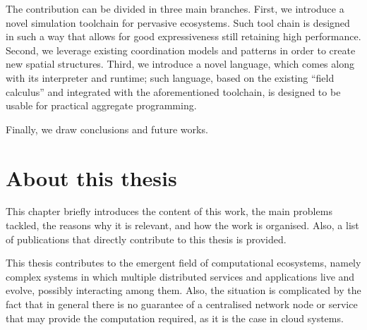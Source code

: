 \documentclass[12pt,a4paper,twoside,openright]{book}
\begin{document}
The contribution can be divided in three main branches.
%
First, we introduce a novel simulation toolchain for pervasive ecosystems. Such tool chain is designed in such a way that allows for good expressiveness still retaining high performance.
%
Second, we leverage existing coordination models and patterns in order to create new spatial structures.
%
Third, we introduce a novel language, which comes along with its interpreter and runtime; such language, based on the existing ``field calculus'' and integrated with the aforementioned toolchain, is designed to be usable for practical aggregate programming.

Finally, we draw conclusions and future works.

\mainmatter

\pagestyle{fancy}
\fancyhead[LE,RO]{\bfseries\thepage}

\chapter{About this thesis}

This chapter briefly introduces the content of this work, the main problems tackled, the reasons why it is relevant, and how the work is organised. Also, a list of publications that directly contribute to this thesis is provided.

This thesis contributes to the emergent field of computational ecosystems, namely complex systems in which multiple distributed services and applications live and evolve, possibly interacting among them.
%
Also, the situation is complicated by the fact that in general there is no guarantee of a centralised network node or service that may provide the computation required, as it is the case in cloud systems.
\end{document}
